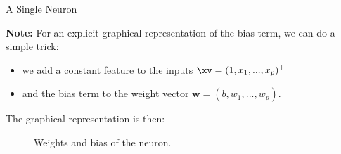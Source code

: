 \begin{frame}{A Single Neuron}

\textbf{Note:} For an explicit graphical representation of the bias term, we can do a simple trick: 

\begin{itemize}
  \item we add a constant feature to the inputs $\tilde{\xv} = (1, x_1, ..., x_p)^\top$
  \item and the bias term to the weight vector $\tilde{\bm{w}} = (b, w_1, ..., w_p)$.
\end{itemize}

The graphical representation is then: 

\vspace*{-0.1cm}

\begin{figure}
            \caption{Weights and bias of the neuron.}
\end{figure}

\end{frame}

